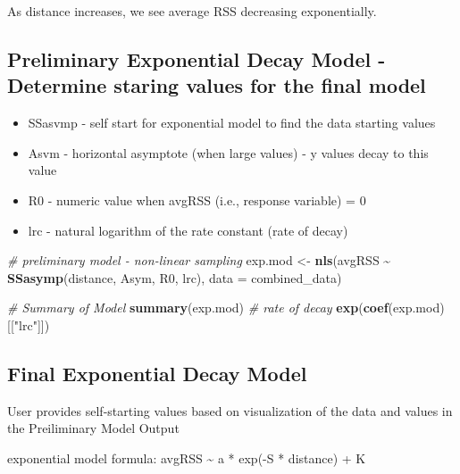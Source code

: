 \documentclass[
]{book}
\newenvironment{Shaded}{\begin{snugshade}}{\end{snugshade}}
\newcommand{\AttributeTok}[1]{\textcolor[rgb]{0.13,0.29,0.53}{#1}}
\newcommand{\CommentTok}[1]{\textcolor[rgb]{0.56,0.35,0.01}{\textit{#1}}}
\newcommand{\FunctionTok}[1]{\textcolor[rgb]{0.13,0.29,0.53}{\textbf{#1}}}
\newcommand{\NormalTok}[1]{#1}
\newcommand{\OtherTok}[1]{\textcolor[rgb]{0.56,0.35,0.01}{#1}}
\newcommand{\SpecialCharTok}[1]{\textcolor[rgb]{0.81,0.36,0.00}{\textbf{#1}}}
\newcommand{\StringTok}[1]{\textcolor[rgb]{0.31,0.60,0.02}{#1}}
\providecommand{\tightlist}{%
  \setlength{\itemsep}{0pt}\setlength{\parskip}{0pt}}
\begin{document}
As distance increases, we see average RSS decreasing exponentially.

\subsection{Preliminary Exponential Decay Model - Determine staring values for the final model}\label{preliminary-exponential-decay-model---determine-staring-values-for-the-final-model}

\begin{itemize}
\tightlist
\item
  SSasvmp - self start for exponential model to find the data starting values
\item
  Asvm - horizontal asymptote (when large values) - y values decay to this value
\item
  R0 - numeric value when avgRSS (i.e., response variable) = 0
\item
  lrc - natural logarithm of the rate constant (rate of decay)
\end{itemize}

\begin{Shaded}
\begin{Highlighting}[]
\CommentTok{\# preliminary model {-} non{-}linear sampling}
\NormalTok{exp.mod }\OtherTok{\textless{}{-}} \FunctionTok{nls}\NormalTok{(avgRSS }\SpecialCharTok{\textasciitilde{}} \FunctionTok{SSasymp}\NormalTok{(distance, }
\NormalTok{                                Asym, }
\NormalTok{                                R0, }
\NormalTok{                                lrc), }
               \AttributeTok{data =}\NormalTok{ combined\_data)}

  \CommentTok{\# Summary of Model}
\FunctionTok{summary}\NormalTok{(exp.mod)}
  \CommentTok{\# rate of decay}
\FunctionTok{exp}\NormalTok{(}\FunctionTok{coef}\NormalTok{(exp.mod)[[}\StringTok{"lrc"}\NormalTok{]])}
\end{Highlighting}
\end{Shaded}

\subsection{Final Exponential Decay Model}\label{final-exponential-decay-model}

User provides self-starting values based on visualization of the data and values in the Preiliminary Model Output

exponential model formula: avgRSS \textasciitilde{} a * exp(-S * distance) + K
\end{document}

